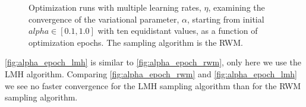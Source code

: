 \begin{figure}[!htb]
\qquad
{}
\caption{Optimization runs with multiple learning rates, $\eta$, examining the convergence of the variational parameter, $\alpha$, starting from initial $alpha\in[0.1,1.0]$ with ten equidistant values, as a function of optimization epochs. The sampling algorithm is the RWM.}
\label{fig:alpha_epoch_rwm}
\end{figure}

\autoref{fig:alpha_epoch_lmh} is similar to \autoref{fig:alpha_epoch_rwm}, only here we use the LMH algorithm. Comparing \autoref{fig:alpha_epoch_rwm} and \autoref{fig:alpha_epoch_lmh} we see no faster convergence for the LMH sampling algorithm than for the RWM sampling algorithm. 

